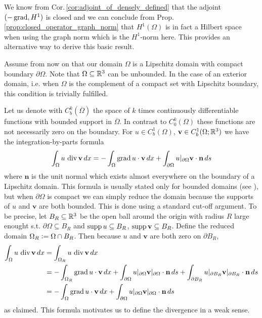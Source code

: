 \documentclass[../master_thesis.tex]{subfiles}
\begin{document}
We know from Cor.\,\ref{cor:adjoint_of_densely_defined} 
that the adjoint $(-\operatorname{grad}, H^1)$ is closed and 
we can conclude from Prop.\,\ref{prop:closed_operator_graph_norm} 
that $H^1(\Omega)$ is in fact a Hilbert space 
when using the graph norm which is the $H^1$-norm here. This provides an alternative 
way to derive this basic result.

Assume from now on that our domain $\Omega$ is a Lipschitz domain 
with compact boundary $\partial \Omega$. Note that $\Omega \subseteq \mathbb{R}^3$ 
can be unbounded. In the case of an exterior domain, i.e. when $\Omega$ is 
the complement of a compact set with Lipschitz boundary, this condition is trivially fulfilled.

Let us denote with $C^k_b(\overline{\Omega})$ the space of $k$ times continuously
differentiable functions with bounded support in $\overline{\Omega}$. 
In contrast to $C^k_0(\Omega)$ these functions are not necessarily zero on the 
boundary.
For $u \in C_b^1(\Omega)$, $\mathbf{v} \in C_b^1(\Omega;\mathbb{R}^3)$ we 
have the integration-by-parts formula
\begin{align}
    \int_\Omega u \, \diver \mathbf{v} \, dx
    = - \int_\Omega \grad u \cdot \mathbf{v} \, dx
        + \int_{\partial \Omega} u|_{\partial \Omega} \mathbf{v}\cdot\mathbf{n} \, ds
        \label{eq:integration_by_parts_C1}
\end{align}
where $\mathbf{n}$ is the unit normal which exists almost everywhere on the boundary of a 
Lipschitz domain. This formula is usually stated only for 
bounded domains (see \cite[Cor.\,3.20]{monk}), but when $\partial \Omega$ is compact 
we can simply reduce the domain 
because the supports of $u$ and $\mathbf{v}$ are both bounded. This is done using 
a standard cut-off argument.
To be precise, let $B_R \subseteq \mathbb{R}^3$ be the open ball around the origin 
with radius $R$ large enought s.t. $\partial \Omega \subseteq B_R$ and 
$\operatorname{supp} u \subseteq B_R$, $\operatorname{supp} \mathbf{v} \subseteq B_R$.
Define the reduced domain $\Omega_R \vcentcolon= \Omega \cap B_R$. 
Then because $u$ and $\mathbf{v}$ are both zero on $\partial B_R$,
\begin{align*}
    \int_\Omega u \, \operatorname{div} \mathbf{v} \, dx
    &= \int_{\Omega_R} u \, \operatorname{div} \mathbf{v} \, dx
    \\ &= - \int_{\Omega_R} \operatorname{grad} u \cdot \mathbf{v} \, dx
        + \int_{\partial \Omega} u|_{\partial \Omega} \mathbf{v}|_{\partial \Omega} \cdot\mathbf{n} \, ds
        + \int_{\partial B_R} u|_{\partial B_R} \mathbf{v}|_{\partial B_R} \cdot\mathbf{n} \, ds
    \\ &= - \int_\Omega \operatorname{grad} u \cdot \mathbf{v} \, dx
        + \int_{\partial \Omega} u|_{\partial \Omega} \mathbf{v}|_{\partial \Omega}\cdot\mathbf{n} \, ds
\end{align*}
as claimed. This formula motivates us to define the divergence in a
weak sense.
\end{document}
